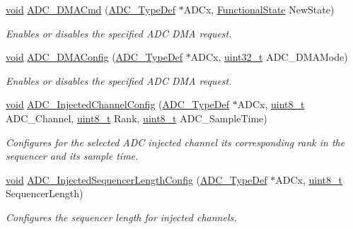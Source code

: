 \begin{DoxyCompactItemize}
\hyperlink{group___n_a_m_e_ga18028b8badbf1ea7e704ccac3c488e82}{void} \hyperlink{group___a_d_c___exported___constants_gac5881d5995818001584b27b137a8dbcb}{A\-D\-C\-\_\-\-D\-M\-A\-Cmd} (\hyperlink{struct_a_d_c___type_def}{A\-D\-C\-\_\-\-Type\-Def} $\ast$A\-D\-Cx, \hyperlink{group___exported__types_gac9a7e9a35d2513ec15c3b537aaa4fba1}{Functional\-State} New\-State)
\begin{DoxyCompactList}\small\item\em Enables or disables the specified A\-D\-C D\-M\-A request. \end{DoxyCompactList}\item 
\hyperlink{group___n_a_m_e_ga18028b8badbf1ea7e704ccac3c488e82}{void} \hyperlink{group___a_d_c___exported___constants_ga450be24f95d7b324a38f03b3484ab57f}{A\-D\-C\-\_\-\-D\-M\-A\-Config} (\hyperlink{struct_a_d_c___type_def}{A\-D\-C\-\_\-\-Type\-Def} $\ast$A\-D\-Cx, \hyperlink{stdint_8h_a435d1572bf3f880d55459d9805097f62}{uint32\-\_\-t} A\-D\-C\-\_\-\-D\-M\-A\-Mode)
\begin{DoxyCompactList}\small\item\em Enables or disables the specified A\-D\-C D\-M\-A request. \end{DoxyCompactList}\item 
\hyperlink{group___n_a_m_e_ga18028b8badbf1ea7e704ccac3c488e82}{void} \hyperlink{group___a_d_c___exported___constants_gae2b44bff080184e1cf6f2cb6b9bb3e59}{A\-D\-C\-\_\-\-Injected\-Channel\-Config} (\hyperlink{struct_a_d_c___type_def}{A\-D\-C\-\_\-\-Type\-Def} $\ast$A\-D\-Cx, \hyperlink{stdint_8h_aba7bc1797add20fe3efdf37ced1182c5}{uint8\-\_\-t} A\-D\-C\-\_\-\-Channel, \hyperlink{stdint_8h_aba7bc1797add20fe3efdf37ced1182c5}{uint8\-\_\-t} Rank, \hyperlink{stdint_8h_aba7bc1797add20fe3efdf37ced1182c5}{uint8\-\_\-t} A\-D\-C\-\_\-\-Sample\-Time)
\begin{DoxyCompactList}\small\item\em Configures for the selected A\-D\-C injected channel its corresponding rank in the sequencer and its sample time. \end{DoxyCompactList}\item 
\hyperlink{group___n_a_m_e_ga18028b8badbf1ea7e704ccac3c488e82}{void} \hyperlink{group___a_d_c___exported___constants_gab7b02acec71ff12a8388bc70ab1e40f8}{A\-D\-C\-\_\-\-Injected\-Sequencer\-Length\-Config} (\hyperlink{struct_a_d_c___type_def}{A\-D\-C\-\_\-\-Type\-Def} $\ast$A\-D\-Cx, \hyperlink{stdint_8h_aba7bc1797add20fe3efdf37ced1182c5}{uint8\-\_\-t} Sequencer\-Length)
\begin{DoxyCompactList}\small\item\em Configures the sequencer length for injected channels. \end{DoxyCompactList}\item 

\end{DoxyCompactItemize}
